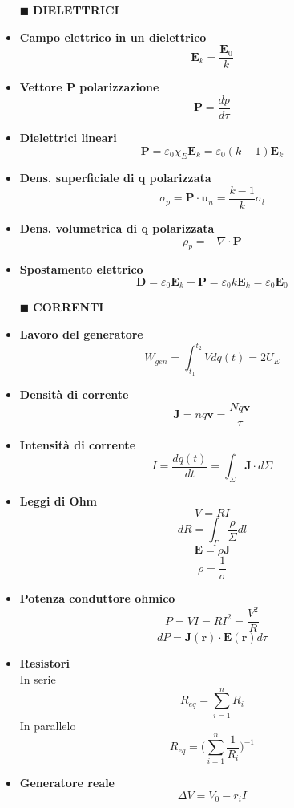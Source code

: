 \documentclass{book}
\newcommand{\g}{\textbf}
\newcommand{\h}{\mathbf}
\newcommand{\e}{\begin{equation}}
\newcommand{\ex}{\end{equation} }
\renewcommand{\it}{\item[$\cdot$]}
\begin{document}
\begin{multicols*}{4}
\begin{itemize}
\item [$\blacksquare$] \g{DIELETTRICI}
    \it \g{Campo elettrico in un dielettrico}
        \e{\h{E}_k=\frac{\h{E}_0}{k}} \ex
    \it \g{Vettore P polarizzazione}
        \e{\h{P}=\frac{dp}{d\tau}} \ex
    \it \g{Dielettrici lineari}
        \e{\h{P}=\varepsilon_0\chi_E \h{E}_k=\varepsilon_0(k-1)\h{E}_k} \ex
    \it \g{Dens. superficiale di q polarizzata}
        \e{\sigma_p=\h{P}\cdot\h{u}_n=\frac{k-1}{k}\sigma_l} \ex
    \it \g{Dens. volumetrica di q polarizzata}
        \e{\rho_p=-\nabla\cdot\h{P}} \ex
    \it \g{Spostamento elettrico}
        \e{\h{D}=\varepsilon_0 \h{E}_k+\h{P}=\varepsilon_0 k \h{E}_k=\varepsilon_0 \h{E}_0} \ex

\item [$\blacksquare$] \g{CORRENTI}
    \it \g{Lavoro del generatore}
        \e{W_{gen}=\int_{t_1}^{t_2} V dq(t)=2U_E} \ex
    \it \g{Densità di corrente}
        \e{\h{J}=nq\h{v}=\frac{Nq\h{v}}{\tau}} \ex
    \it \g{Intensità di corrente}
        \e{I=\frac{dq(t)}{dt}=\int_\Sigma \h{J}\cdot d\Sigma} \ex
    \it \g{Leggi di Ohm}
        \e{V=RI} \ex
        \e{dR=\int_\Gamma\frac{\rho}{\Sigma}dl} \ex
        \e{\h{E}=\rho\h{J}} \ex
        \e{\rho=\frac{1}{\sigma}} \ex
    \it \g{Potenza conduttore ohmico}
        \e{P=VI=RI^2=\frac{V^2}{R}} \ex
        \e{dP=\h{J}(\h{r})\cdot\h{E}(\h{r})d\tau} \ex
    \it \g{Resistori} \\
        In serie
        \e{R_{eq}= \sum_{i=1}^n R_i} \ex
        In parallelo
        \e{R_{eq}=\biggl( \sum_{i=1}^n \frac{1}{R_i} \biggr)^{-1}} \ex
    \it \g{Generatore reale} \\
        \e{\Delta V=V_0-r_i I}\ex


\end{itemize}
\end{multicols*}
\end{document}
